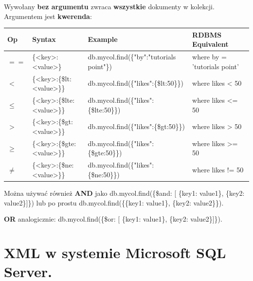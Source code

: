 \documentclass[a4paper]{article}
\begin{document}
    Wywołany \textbf{bez argumentu} zwraca \textbf{wszystkie} dokumenty w kolekcji. Argumentem jest \textbf{kwerenda}:
    \begin{table}[H]
        \begin{center}
            \begin{tabular}{| p{0.5cm} || p{4cm} | p{6cm} | p{4.5cm} |}
                \hline
                \textbf{Op} & \textbf{Syntax} & \textbf{Example} & \textbf{RDBMS Equivalent}\\
                \hline
                \hline
                $==$ & \{<key>:<value>\} & db.mycol.find(\{"by":"tutorials point"\}) & where by = 'tutorials point'\\
                \hline
                $<$ & \{<key>:\{\$lt:<value>\}\} & db.mycol.find(\{"likes":\{\$lt:50\}\}) & where likes < 50\\
                \hline
                $\leq$ & \{<key>:\{\$lte:<value>\}\} & db.mycol.find(\{"likes":\{\$lte:50\}\}) & where likes <= 50\\
                \hline
                $>$ & \{<key>:\{\$gt:<value>\}\} & db.mycol.find(\{"likes":\{\$gt:50\}\}) & where likes > 50\\
                \hline
                $\geq$ & \{<key>:\{\$gte:<value>\}\} & db.mycol.find(\{"likes":\{\$gte:50\}\}) & where likes >= 50\\
                \hline
                $\neq$ & \{<key>:\{\$ne:<value>\}\} & db.mycol.find(\{"likes":\{\$ne:50\}\}) & where likes != 50\\
                \hline
            \end{tabular}
        \end{center}
    \end{table}

    Można używać również \textbf{AND} jako db.mycol.find(\{\$and: [ \{key1: value1\}, \{key2: value2\}]\}) lub po prostu db.mycol.find(\{\{key1: value1\}, \{key2: value2\}\}).

    \textbf{OR} analogicznie: db.mycol.find(\{\$or: [ \{key1: value1\}, \{key2: value2\}]\}).
    \
    \section{XML w systemie Microsoft SQL Server.}
\end{document}
